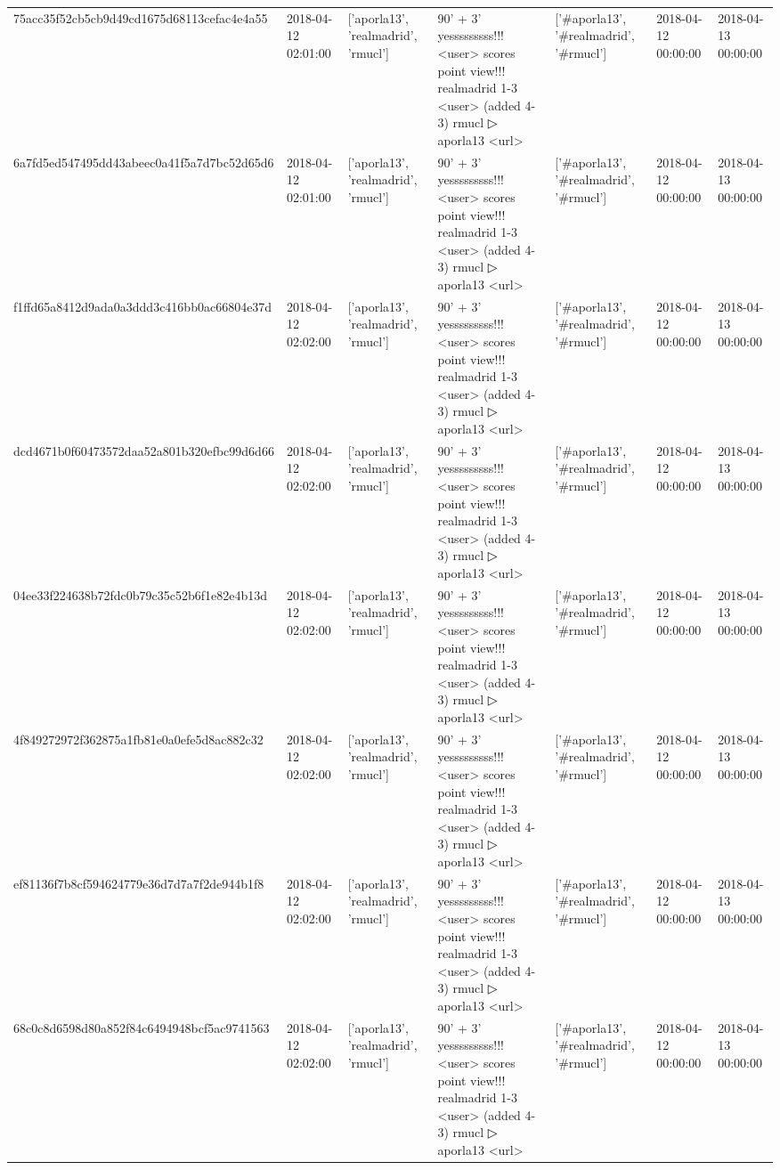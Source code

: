 \begin{tabular}{lllllll}
75acc35f52cb5cb9d49cd1675d68113cefac4e4a55 & 2018-04-12 02:01:00 & ['aporla13', 'realmadrid', 'rmucl'] & 90' + 3' yesssssssss!!! <user> scores point view!!! realmadrid 1-3 <user> (added 4-3) rmucl ▷ aporla13 <url> & ['#aporla13', '#realmadrid', '#rmucl'] & 2018-04-12 00:00:00 & 2018-04-13 00:00:00 \\
6a7fd5ed547495dd43abeec0a41f5a7d7bc52d65d6 & 2018-04-12 02:01:00 & ['aporla13', 'realmadrid', 'rmucl'] & 90' + 3' yesssssssss!!! <user> scores point view!!! realmadrid 1-3 <user> (added 4-3) rmucl ▷ aporla13 <url> & ['#aporla13', '#realmadrid', '#rmucl'] & 2018-04-12 00:00:00 & 2018-04-13 00:00:00 \\
f1ffd65a8412d9ada0a3ddd3c416bb0ac66804e37d & 2018-04-12 02:02:00 & ['aporla13', 'realmadrid', 'rmucl'] & 90' + 3' yesssssssss!!! <user> scores point view!!! realmadrid 1-3 <user> (added 4-3) rmucl ▷ aporla13 <url> & ['#aporla13', '#realmadrid', '#rmucl'] & 2018-04-12 00:00:00 & 2018-04-13 00:00:00 \\
dcd4671b0f60473572daa52a801b320efbc99d6d66 & 2018-04-12 02:02:00 & ['aporla13', 'realmadrid', 'rmucl'] & 90' + 3' yesssssssss!!! <user> scores point view!!! realmadrid 1-3 <user> (added 4-3) rmucl ▷ aporla13 <url> & ['#aporla13', '#realmadrid', '#rmucl'] & 2018-04-12 00:00:00 & 2018-04-13 00:00:00 \\
04ee33f224638b72fdc0b79c35c52b6f1e82e4b13d & 2018-04-12 02:02:00 & ['aporla13', 'realmadrid', 'rmucl'] & 90' + 3' yesssssssss!!! <user> scores point view!!! realmadrid 1-3 <user> (added 4-3) rmucl ▷ aporla13 <url> & ['#aporla13', '#realmadrid', '#rmucl'] & 2018-04-12 00:00:00 & 2018-04-13 00:00:00 \\
4f849272972f362875a1fb81e0a0efe5d8ac882c32 & 2018-04-12 02:02:00 & ['aporla13', 'realmadrid', 'rmucl'] & 90' + 3' yesssssssss!!! <user> scores point view!!! realmadrid 1-3 <user> (added 4-3) rmucl ▷ aporla13 <url> & ['#aporla13', '#realmadrid', '#rmucl'] & 2018-04-12 00:00:00 & 2018-04-13 00:00:00 \\
ef81136f7b8cf594624779e36d7d7a7f2de944b1f8 & 2018-04-12 02:02:00 & ['aporla13', 'realmadrid', 'rmucl'] & 90' + 3' yesssssssss!!! <user> scores point view!!! realmadrid 1-3 <user> (added 4-3) rmucl ▷ aporla13 <url> & ['#aporla13', '#realmadrid', '#rmucl'] & 2018-04-12 00:00:00 & 2018-04-13 00:00:00 \\
68c0c8d6598d80a852f84c6494948bcf5ac9741563 & 2018-04-12 02:02:00 & ['aporla13', 'realmadrid', 'rmucl'] & 90' + 3' yesssssssss!!! <user> scores point view!!! realmadrid 1-3 <user> (added 4-3) rmucl ▷ aporla13 <url> & ['#aporla13', '#realmadrid', '#rmucl'] & 2018-04-12 00:00:00 & 2018-04-13 00:00:00 \\

\end{tabular}
